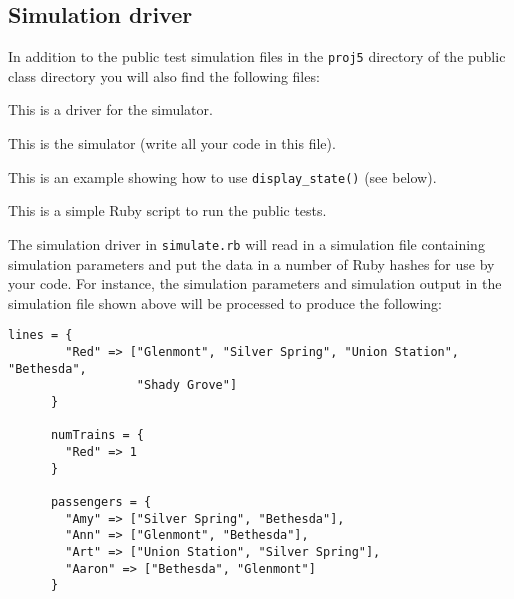 \documentclass[11pt]{article}
\begin{document}
      \vspace{-2mm}

    \subsection{Simulation driver}

      In addition to the public test simulation files in the \texttt{proj5}
    directory of the public class directory you will also find the following
    files:

      \vspace{-2.5mm}

      \begin{description}

        \addtolength{\itemsep}{-1.5mm}

          \item[\texttt{simulate.rb}:] This is a driver for the simulator.

          \item[\texttt{metro.rb}:] This is the simulator (write all your
                code in this file).

          \item[\texttt{display-example.rb}:] This is an example showing how
                to use \texttt{display\_state()} (see below).

          \item[\texttt{run-public-tests.rb}:] This is a simple Ruby script
                to run the public tests.

      \end{description}

      \vspace{-2mm}

      The simulation driver in \texttt{simulate.rb} will read in a simulation
    file containing simulation parameters and put the data in a number of
    Ruby hashes for use by your code.  For instance, the simulation
    parameters and simulation output in the simulation file shown above will
    be processed to produce the following:

      \vspace{-1mm}

      \begin{Verbatim}[gobble=6,commandchars=\\\<\>,xleftmargin=22mm]
      lines = {
        "Red" => ["Glenmont", "Silver Spring", "Union Station", "Bethesda",
                  "Shady Grove"]
      }

      numTrains = {
        "Red" => 1
      }

      passengers = {
        "Amy" => ["Silver Spring", "Bethesda"],
        "Ann" => ["Glenmont", "Bethesda"],
        "Art" => ["Union Station", "Silver Spring"],
        "Aaron" => ["Bethesda", "Glenmont"]
      }
      \end{Verbatim}
\end{document}

